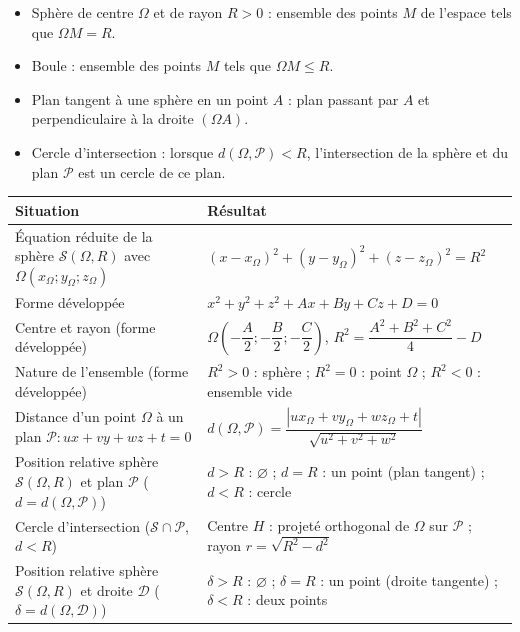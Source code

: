 \documentclass[11pt]{article}
\newcommand{\cle}[1]{{\popxbold\color{popdark}#1}}
\begin{document}
\begin{definition}
\begin{itemize}
  \item \cle{Sphère} de centre $\Omega$ et de rayon $R>0$ : ensemble des points $M$ de l'espace tels que $\Omega M = R$.
  \item \cle{Boule} : ensemble des points $M$ tels que $\Omega M \le R$.
  \item \cle{Plan tangent} à une sphère en un point $A$ : plan passant par $A$ et perpendiculaire à la droite $(\Omega A)$.
  \item \cle{Cercle d'intersection} : lorsque $d(\Omega,\mathcal{P}) < R$, l'intersection de la sphère et du plan $\mathcal{P}$ est un cercle de ce plan.
\end{itemize}
\end{definition}

\begin{propriete}
\begin{center}
\begin{tabularx}{\linewidth}{|l|X|}\hline
\rowcolor{popblueL} \textbf{Situation} & \textbf{Résultat} \\ \hline
Équation réduite de la sphère $\mathcal{S}(\Omega,R)$ avec $\Omega(x_\Omega;y_\Omega;z_\Omega)$ & $(x-x_\Omega)^2+(y-y_\Omega)^2+(z-z_\Omega)^2=R^2$ \\ \hline
Forme développée & $x^2+y^2+z^2+Ax+By+Cz+D=0$ \\ \hline
Centre et rayon (forme développée) & $\Omega\left(-\dfrac{A}{2};-\dfrac{B}{2};-\dfrac{C}{2}\right)$, \quad $R^2=\dfrac{A^2+B^2+C^2}{4}-D$ \\ \hline
Nature de l'ensemble (forme développée) & $R^2>0$ : sphère ; \quad $R^2=0$ : point $\Omega$ ; \quad $R^2<0$ : ensemble vide \\ \hline
Distance d'un point $\Omega$ à un plan $\mathcal{P}: ux+vy+wz+t=0$ & $d(\Omega,\mathcal{P})=\dfrac{|u x_\Omega+v y_\Omega+w z_\Omega+t|}{\sqrt{u^2+v^2+w^2}}$ \\ \hline
Position relative sphère $\mathcal{S}(\Omega,R)$ et plan $\mathcal{P}$ ($d=d(\Omega,\mathcal{P})$) & $d>R$ : $\varnothing$ ; \quad $d=R$ : un point (plan tangent) ; \quad $d<R$ : cercle \\ \hline
Cercle d'intersection ($\mathcal{S} \cap \mathcal{P}$, $d<R$) & Centre $H$ : projeté orthogonal de $\Omega$ sur $\mathcal{P}$ ; \quad rayon $r=\sqrt{R^2-d^2}$ \\ \hline
Position relative sphère $\mathcal{S}(\Omega,R)$ et droite $\mathcal{D}$ ($\delta=d(\Omega,\mathcal{D})$) & $\delta>R$ : $\varnothing$ ; \quad $\delta=R$ : un point (droite tangente) ; \quad $\delta<R$ : deux points \\ \hline
\end{tabularx}
\end{center}
\end{propriete}
\end{document}
